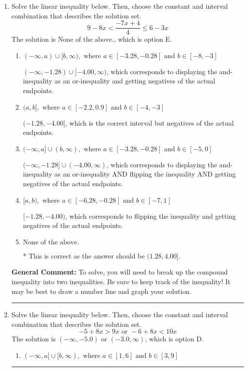 \documentclass{extbook}[14pt]
\newcommand{\litem}[1]{\item #1

\rule{\textwidth}{0.4pt}}
\begin{document}
\begin{enumerate}
{\begin{enumerate}[label=\Alph*.]
You may have chosen this if you thought the inequality did not match the ends of the intervals.
\end{enumerate}

\textbf{General Comment:} Remember that less/greater than or equal to includes the endpoint, while less/greater do not. Also, remember that you need to flip the inequality when you multiply or divide by a negative.
}
\litem{
Solve the linear inequality below. Then, choose the constant and interval combination that describes the solution set.
\[ 9 - 8 x < \frac{-7 x + 4}{4} \leq 6 - 3 x \]
The solution is \( \text{None of the above.} \), which is option E.\begin{enumerate}[label=\Alph*.]
\item \( (-\infty, a) \cup [b, \infty), \text{ where } a \in [-3.28, -0.28] \text{ and } b \in [-8, -3] \)

$(-\infty, -1.28) \cup [-4.00, \infty)$, which corresponds to displaying the and-inequality as an or-inequality and getting negatives of the actual endpoints.
\item \( (a, b], \text{ where } a \in [-2.2, 0.9] \text{ and } b \in [-4, -3] \)

$(-1.28, -4.00]$, which is the correct interval but negatives of the actual endpoints.
\item \( (-\infty, a] \cup (b, \infty), \text{ where } a \in [-3.28, -0.28] \text{ and } b \in [-5, 0] \)

$(-\infty, -1.28] \cup (-4.00, \infty)$, which corresponds to displaying the and-inequality as an or-inequality AND flipping the inequality AND getting negatives of the actual endpoints.
\item \( [a, b), \text{ where } a \in [-6.28, -0.28] \text{ and } b \in [-7, 1] \)

$[-1.28, -4.00)$, which corresponds to flipping the inequality and getting negatives of the actual endpoints.
\item \( \text{None of the above.} \)

* This is correct as the answer should be $(1.28, 4.00]$.
\end{enumerate}

\textbf{General Comment:} To solve, you will need to break up the compound inequality into two inequalities. Be sure to keep track of the inequality! It may be best to draw a number line and graph your solution.
}
\litem{
Solve the linear inequality below. Then, choose the constant and interval combination that describes the solution set.
\[ -5 + 8 x > 9 x \text{ or } -6 + 8 x < 10 x \]
The solution is \( (-\infty, -5.0) \text{ or } (-3.0, \infty) \), which is option D.\begin{enumerate}[label=\Alph*.]
\item \( (-\infty, a] \cup [b, \infty), \text{ where } a \in [1, 6] \text{ and } b \in [3, 9] \)


\end{enumerate}}
\end{enumerate}
\end{document}
